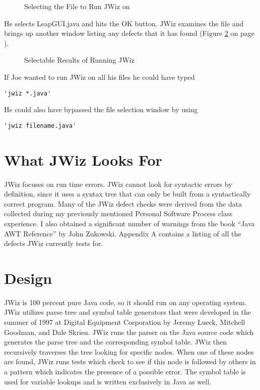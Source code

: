 \begin{figure}[htp] %
  {\centerline{}}
  \caption{Selecting the File to Run JWiz on}
  \label{FileSelected}
\end{figure}

He selects LeapGUI.java and hits the OK button.  JWiz examines the file and
brings up another window listing any defects that it has found (Figure
\ref{JWizResults1} on page \pageref{JWizResults1}).

\begin{figure}[htb]
  {\centerline{}}
  \caption{Selectable Results of Running JWiz}
  \label{JWizResults1}
\end{figure}

If Joe wanted to run JWiz on all his files he could have typed 
\begin{verbatim}'jwiz *.java'\end{verbatim}
He could also have bypassed the file selection window by using
\begin{verbatim}'jwiz filename.java'\end{verbatim}

\section{What JWiz Looks For}
JWiz focuses on run time errors.  JWiz cannot look for syntactic errors by
definition, since it uses a syntax tree that can only be built from a
syntactically correct program.  Many of the JWiz defect checks were derived
from the data collected during my previously mentioned Personal Software
Process class experience.  I also obtained a significant number of warnings
from the book ``Java AWT Reference'' by John Zukowski\cite{Zukowski97}.
Appendix A contains a listing of all the defects JWiz currently tests for.

\section{Design}
JWiz is 100 percent pure Java code, so it should run on any operating
system.  JWiz utilizes parse tree and symbol table generators that were
developed in the summer of 1997 at Digital Equipment Corporation by Jeremy
Lueck, Mitchell Goodman, and Dale Skrien.  JWiz runs the parser on the Java
source code which generates the parse tree and the corresponding symbol
table.  JWiz then recursively traverses the tree looking for specific
nodes.  When one of these nodes are found, JWiz runs tests which check to
see if this node is followed by others in a pattern which indicates the
presence of a possible error.  The symbol table is used for variable
lookups and is written exclusively in Java as well.

